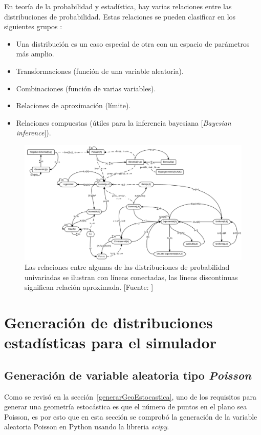 En teoría de la probabilidad y estadística, hay varias relaciones entre las distribuciones de probabilidad. Estas relaciones se pueden clasificar en los siguientes grupos \parencite{univariateDist}:
\begin{itemize}
    \item Una distribución es un caso especial de otra con un espacio de parámetros más amplio.
    \item Transformaciones (función de una variable aleatoria).
    \item Combinaciones (función de varias variables).
    \item Relaciones de aproximación (límite).
    \item Relaciones compuestas (útiles para la inferencia bayesiana [\textit{Bayesian inference}]).
\end{itemize}

\begin{figure}[th]
    \centering
    \includegraphics[scale=0.63]{Figures/RelacionesProbabilidad}
    \decoRule
    \caption[Relaciones entre algunas de las distribuciones de probabilidad univariadas]{Las relaciones entre algunas de las distribuciones de probabilidad univariadas se ilustran con líneas conectadas, las líneas discontinuas significan relación aproximada. [Fuente: \parencite{univariateDist}]}
    \label{fig:relacionesDistribuciones}
\end{figure}

\break

\section{Generación de distribuciones estadísticas para el simulador}

\subsection{Generación de variable aleatoria tipo \textit{Poisson}}
Como se revisó en la sección~\ref{generarGeoEstocastica}, uno de los requisitos para generar una geometría estocástica es que el número de puntos en el plano sea Poisson, es por esto que en esta sección se comprobó la generación de la variable aleatoria Poisson en Python usando la libreria \textit{scipy}.\newline

